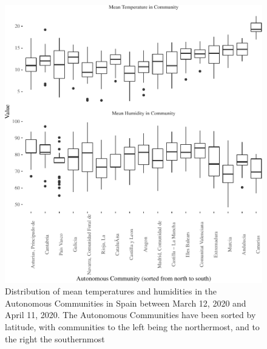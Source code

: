 \documentclass[]{elsarticle} %
\makeatletter
\def\maxwidth{\ifdim\Gin@nat@width>\linewidth\linewidth
\else\Gin@nat@width\fi}
\let\Oldincludegraphics\includegraphics
\renewcommand{\includegraphics}[1]{\Oldincludegraphics[width=\maxwidth]{#1}}
\makeatother
\begin{document}
\begin{figure}
\centering
\includegraphics{Environmental-Correlates-of-COVID19-Spain_files/figure-latex/descriptives-temperature-1.pdf}
\caption{\label{fig:descriptives-temperature} Distribution of mean
temperatures and humidities in the Autonomous Communities in Spain
between March 12, 2020 and April 11, 2020. The Autonomous Communities
have been sorted by latitude, with communities to the left being the
northermost, and to the right the southernmost}
\end{figure}
\end{document}
